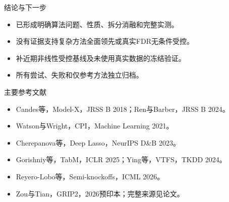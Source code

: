 \documentclass[aspectratio=169]{beamer}
\begin{document}
\begin{frame}{结论与下一步}
\begin{itemize}
\item 已形成明确算法问题、性质、拆分消融和完整实测。
\item 没有证据支持复杂方法全面领先或真实FDR无条件受控。
\item 补近期非线性受控基线及未使用真实数据的冻结验证。
\item 所有尝试、失败和仅参考方法独立归档。
\end{itemize}
\end{frame}
\begin{frame}{主要参考文献}
\begin{itemize}
\item Candes等，Model-X，JRSS B 2018；Ren与Barber，JRSS B 2024。
\item Watson与Wright，CPI，Machine Learning 2021。
\item Cherepanova等，Deep Lasso，NeurIPS D\&B 2023。
\item Gorishniy等，TabM，ICLR 2025；Ying等，VTFS，TKDD 2024。
\item Reyero-Lobo等，Semi-knockoffs，ICML 2026。
\item Zou与Tian，GRIP2，2026预印本；完整来源见论文。
\end{itemize}
\end{frame}
\end{document}
